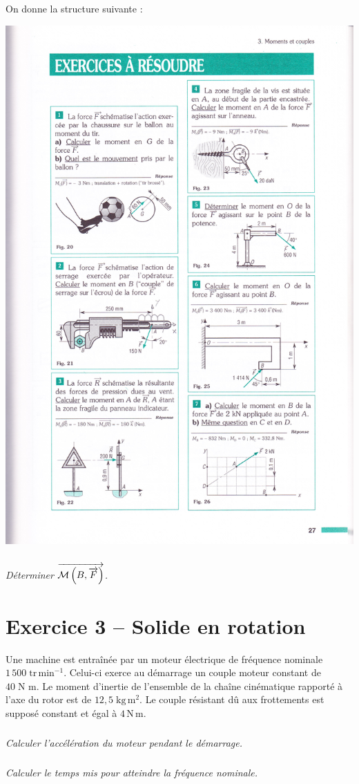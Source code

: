 \documentclass[10pt,fleqn]{book} %
\begin{document}
\begin{multicols}{2}
On donne la structure suivante : 
\begin{center}
\includegraphics[width=.8\linewidth]{images/fig_03}
\end{center}


\subparagraph{}
\textit{Déterminer $\overrightarrow{\mathcal{M}\left(B,\overrightarrow{F} \right)}$.}




\section*{Exercice 3 -- Solide en rotation}
\setcounter{subparagraph}{0}

 Une machine est entraînée par un moteur électrique de fréquence nominale $1\,500\; \text{tr}\,\text{min}^{-1}$. Celui-ci exerce au démarrage un couple moteur constant de $40\; \text{N}\,\,\text{m}$. Le moment d’inertie de l’ensemble de la chaîne cinématique rapporté à l’axe du rotor est de $12,5\; \text{kg}\,\text{m}^2$. Le couple résistant dû aux frottements est supposé constant et égal à $4\, \text{N} \, \text{m}$.

\subparagraph{}
\textit{Calculer l’accélération du moteur pendant le démarrage.}

\subparagraph{}
\textit{Calculer le temps mis pour atteindre la fréquence nominale.}


\end{multicols}
\end{document}
